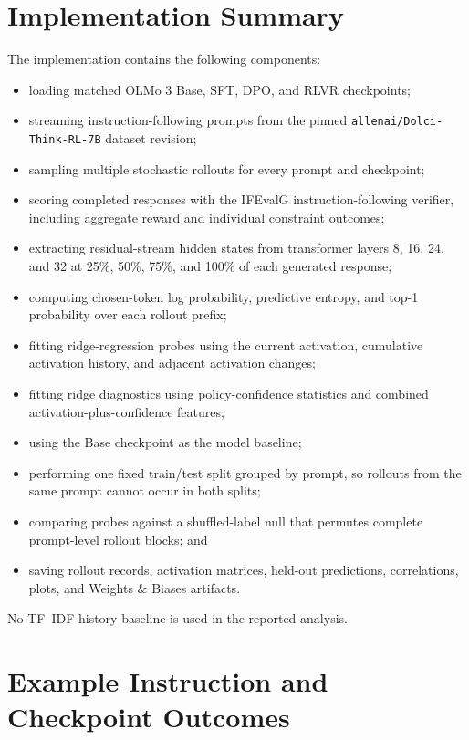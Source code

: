 \appendix

\section{Implementation Summary}

The implementation contains the following components:

\begin{itemize}
    \item loading matched OLMo 3 Base, SFT, DPO, and RLVR checkpoints;
    \item streaming instruction-following prompts from the pinned
    \texttt{allenai/Dolci-Think-RL-7B} dataset revision;
    \item sampling multiple stochastic rollouts for every prompt and checkpoint;
    \item scoring completed responses with the IFEvalG instruction-following
    verifier, including aggregate reward and individual constraint outcomes;
    \item extracting residual-stream hidden states from transformer layers 8,
    16, 24, and 32 at 25\%, 50\%, 75\%, and 100\% of each generated response;
    \item computing chosen-token log probability, predictive entropy, and top-1
    probability over each rollout prefix;
    \item fitting ridge-regression probes using the current activation,
    cumulative activation history, and adjacent activation changes;
    \item fitting ridge diagnostics using policy-confidence statistics and
    combined activation-plus-confidence features;
    \item using the Base checkpoint as the model baseline;
    \item performing one fixed train/test split grouped by prompt, so rollouts
    from the same prompt cannot occur in both splits;
    \item comparing probes against a shuffled-label null that permutes complete
    prompt-level rollout blocks; and
    \item saving rollout records, activation matrices, held-out predictions,
    correlations, plots, and Weights \& Biases artifacts.
\end{itemize}

No TF--IDF history baseline is used in the reported analysis.

\section{Example Instruction and Checkpoint Outcomes}

